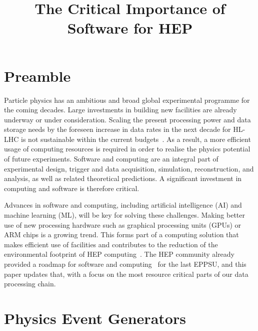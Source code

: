 \documentclass[10pt,a4paper]{article}
\begin{document}

\title{The Critical Importance of Software for HEP}

\maketitle

\tableofcontents


\newpage

\setcounter{page}{1}

\section{Preamble}\label{preamble}

Particle physics has an ambitious and broad global experimental programme for
the coming decades. Large investments in building new facilities are already
underway or under consideration. Scaling the present processing power and data
storage needs by the foreseen increase in data rates in the next decade for
\gls{HL-LHC} is not sustainable within the current
budgets~\cite{CERN-LHCC-2022-005,Software:2815292}. As a result, a more
efficient usage of computing resources is required in order to realise the
physics potential of future experiments. Software and computing are an integral
part of experimental design, trigger and data acquisition, simulation,
reconstruction, and analysis, as well as related theoretical predictions. A
significant investment in computing and software is therefore critical.

Advances in software and computing, including artificial intelligence (AI) and
machine learning (ML), will be key for solving these challenges. Making better
use of new processing hardware such as graphical processing units (GPUs) or ARM
chips is a growing trend. This forms part of a computing solution that makes
efficient use of facilities and contributes to the reduction of the
environmental footprint of HEP computing~\cite{wlcgsust}. The HEP community
already provided a roadmap for software and computing~\cite{hsfcwp} for the last
EPPSU, and this paper updates that, with a focus on the most resource critical
parts of our data processing chain.

\section{Physics Event Generators}\label{physics-event-generators}
\end{document}

